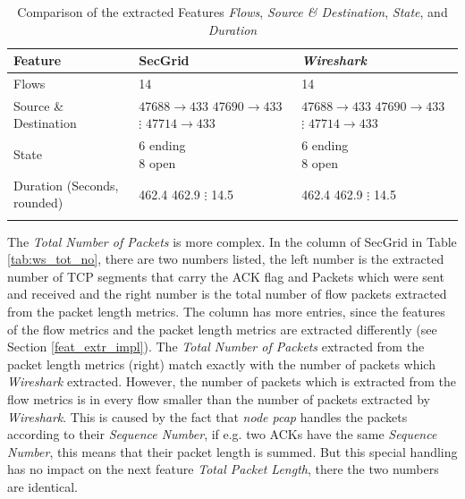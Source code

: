\begin{center}
\begin{longtable}{ |l|l|l| }
\hline
Feature & SecGrid & \textit{Wireshark} \\
\hline
Flows & 14 & 14 \\
\hline
Source \& Destination & \makecell{
$47688 \rightarrow 433$ \\
$47690 \rightarrow 433$ \\
$\vdots$ \\
$47714 \rightarrow 433$ 
} & \makecell{
$47688 \rightarrow 433$ \\
$47690 \rightarrow 433$ \\
$\vdots$ \\
$47714 \rightarrow 433$ 
} \\
\hline
State & \makecell{6 ending \\ 8 open \\} & \makecell{6 ending \\ 8 open } \\
\hline
Duration (Seconds, rounded) & \makecell{
462.4 \\
462.9 \\
$\vdots$ \\
14.5
} & \makecell{
462.4 \\
462.9 \\
$\vdots$ \\
14.5
} \\ 
\hline
\caption{Comparison of the extracted Features \textit{Flows}, \textit{Source \& Destination}, \textit{State}, and \textit{Duration}}
\end{longtable}
\label{tab:ws_first3}
\end{center}

The \textit{Total Number of Packets} is more complex. In the column of SecGrid in Table \ref{tab:ws_tot_no}, there are two numbers listed, the left number is the extracted number of TCP segments that carry the ACK flag and Packets which were sent and received and the right number is the total number of flow packets extracted from the packet length metrics. The column has more entries, since the features of the flow metrics and the packet length metrics are extracted differently (see Section \ref{feat_extr_impl}). The \textit{Total Number of Packets} extracted from the packet length metrics (right) match exactly with the number of packets which \textit{Wireshark} extracted. However, the number of packets which is extracted from the flow metrics is in every flow smaller than the number of packets extracted by \textit{Wireshark}. This is caused by the fact that \textit{node pcap} handles the packets according to their \textit{Sequence Number}, if e.g. two ACKs have the same \textit{Sequence Number}, this means that their packet length is summed. But this special handling has no impact on the next feature \textit{Total Packet Length}, there the two numbers are identical. 

